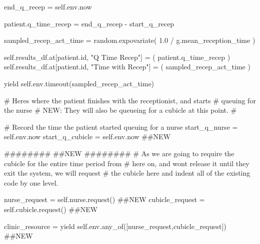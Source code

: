 \documentclass[
  letterpaper,
  DIV=11,
  numbers=noendperiod]{scrreprt}
\newenvironment{Shaded}{\begin{snugshade}}{\end{snugshade}}
\newcommand{\BuiltInTok}[1]{\textcolor[rgb]{0.00,0.23,0.31}{#1}}
\newcommand{\CommentTok}[1]{\textcolor[rgb]{0.37,0.37,0.37}{#1}}
\newcommand{\ControlFlowTok}[1]{\textcolor[rgb]{0.00,0.23,0.31}{#1}}
\newcommand{\FloatTok}[1]{\textcolor[rgb]{0.68,0.00,0.00}{#1}}
\newcommand{\NormalTok}[1]{\textcolor[rgb]{0.00,0.23,0.31}{#1}}
\newcommand{\OperatorTok}[1]{\textcolor[rgb]{0.37,0.37,0.37}{#1}}
\newcommand{\StringTok}[1]{\textcolor[rgb]{0.13,0.47,0.30}{#1}}
\newcommand{\VariableTok}[1]{\textcolor[rgb]{0.07,0.07,0.07}{#1}}
\begin{document}
\begin{tcolorbox}
\begin{Shaded}
\begin{Highlighting}[]
\NormalTok{            end\_q\_recep }\OperatorTok{=} \VariableTok{self}\NormalTok{.env.now}

\NormalTok{            patient.q\_time\_recep }\OperatorTok{=}\NormalTok{ end\_q\_recep }\OperatorTok{{-}}\NormalTok{ start\_q\_recep}

\NormalTok{            sampled\_recep\_act\_time }\OperatorTok{=}\NormalTok{ random.expovariate(}
                \FloatTok{1.0} \OperatorTok{/}\NormalTok{ g.mean\_reception\_time}
\NormalTok{            )}

            \VariableTok{self}\NormalTok{.results\_df.at[patient.}\BuiltInTok{id}\NormalTok{, }\StringTok{"Q Time Recep"}\NormalTok{] }\OperatorTok{=}\NormalTok{ (}
\NormalTok{                 patient.q\_time\_recep}
\NormalTok{            )}
            \VariableTok{self}\NormalTok{.results\_df.at[patient.}\BuiltInTok{id}\NormalTok{, }\StringTok{"Time with Recep"}\NormalTok{] }\OperatorTok{=}\NormalTok{ (}
\NormalTok{                 sampled\_recep\_act\_time}
\NormalTok{            )}

            \ControlFlowTok{yield} \VariableTok{self}\NormalTok{.env.timeout(sampled\_recep\_act\_time)}

        \CommentTok{\# Here\textquotesingle{}s where the patient finishes with the receptionist, and starts}
        \CommentTok{\# queuing for the nurse}
        \CommentTok{\# NEW: They will also be queueing for a cubicle at this point.}
        \CommentTok{\#}

        \CommentTok{\# Record the time the patient started queuing for a nurse}
\NormalTok{        start\_q\_nurse }\OperatorTok{=} \VariableTok{self}\NormalTok{.env.now}
\NormalTok{        start\_q\_cubicle }\OperatorTok{=} \VariableTok{self}\NormalTok{.env.now }\CommentTok{\#\#NEW}

        \CommentTok{\#\#\#\#\#\#\#\#}
        \CommentTok{\#\#NEW}
        \CommentTok{\#\#\#\#\#\#\#\#}
        \CommentTok{\# As we are going to require the cubicle for the entire time period from}
        \CommentTok{\# here on, and won\textquotesingle{}t release it until they exit the system, we will request}
        \CommentTok{\# the cubicle here and indent all of the existing code by one level.}

\NormalTok{        nurse\_request }\OperatorTok{=} \VariableTok{self}\NormalTok{.nurse.request()  }\CommentTok{\#\#NEW}
\NormalTok{        cubicle\_request }\OperatorTok{=} \VariableTok{self}\NormalTok{.cubicle.request() }\CommentTok{\#\#NEW}

\NormalTok{        clinic\_resource }\OperatorTok{=} \ControlFlowTok{yield} \VariableTok{self}\NormalTok{.env.any\_of([nurse\_request,cubicle\_request]) }\CommentTok{\#\#NEW}


\end{Highlighting}
\end{Shaded}
\end{tcolorbox}
\end{document}
